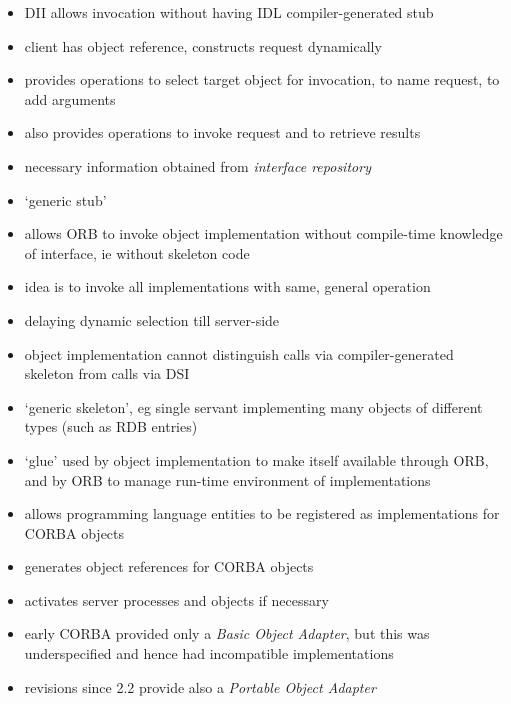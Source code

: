 \documentclass{sepslide-soa-faked} %
\begin{document}
\begin{slide}
\begin{itemize}
\item DII allows invocation without having IDL compiler-generated stub
\item client has object reference, constructs request dynamically
\item provides operations to select target object for invocation, to name
request, to add arguments
\item also provides operations to invoke request and to retrieve results
\item necessary information obtained from \emph{interface repository}
\item `generic stub'
\end{itemize}
\end{slide}

\begin{slide}
\begin{itemize}
\item allows ORB to invoke object implementation without compile-time
knowledge of interface, ie without skeleton code
\item idea is to invoke all implementations with same, general operation
\item delaying dynamic selection till server-side
\item object implementation cannot distinguish calls via compiler-generated
skeleton from calls via DSI
\item `generic skeleton', eg single servant implementing many objects of
  different types (such as RDB entries) %

\end{itemize}
\end{slide}

\begin{slide}
\begin{itemize}
\item `glue' used by object implementation to make itself available through
  ORB, and by ORB to manage run-time environment of implementations 
\item allows programming language entities to be registered as
  implementations for CORBA objects
\item generates object references for CORBA objects
\item activates server processes and objects if necessary
\item early CORBA provided only a \emph{Basic Object Adapter}, but this was
  underspecified and hence had incompatible implementations
\item revisions since 2.2 provide also a \emph{Portable Object Adapter}
\end{itemize}
\end{slide}
\end{document}
